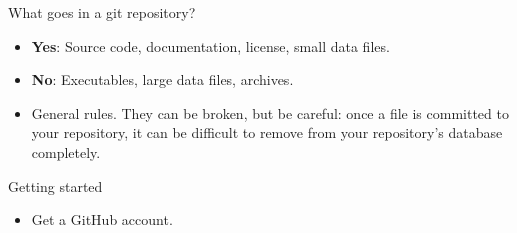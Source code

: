 \documentclass{beamer}
\newenvironment{myitemize}{
  \begin{itemize}
  \setlength{\itemsep}{5pt}
}{\end{itemize}}
\newcommand{\code}[1]{
  \lstinline[language=bash,basicstyle=\ttfamily]{#1}
}
\begin{document}
\begin{frame}[t,fragile]{What goes in a git repository?}
\begin{myitemize}
  \item<1->
    \textbf{Yes}: Source code, documentation, license, small data files.
  \item<2->
    \textbf{No}: Executables, large data files, archives.
  \item<3->
    General rules. They can be broken, but be careful: once a file is
    committed to your repository, it can be difficult to remove from your
    repository's database completely.
\end{myitemize}
\end{frame}

\begin{frame}[t,fragile]{Getting started}
\begin{myitemize}
  \item<1->
    Get a GitHub account.
\end{myitemize}
\end{frame}
\end{document}
